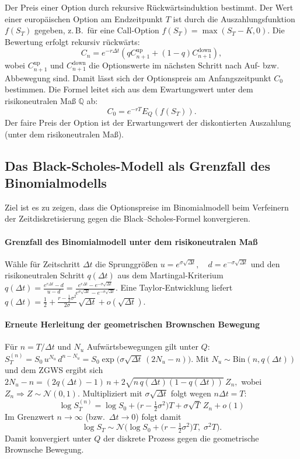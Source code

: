 \begin{satz}
Der Preis einer Option durch rekursive Rückwärtsinduktion bestimmt. 
Der Wert einer europäischen Option am Endzeitpunkt $T$ ist durch die Auszahlungsfunktion $f(S_T)$ gegeben, z.\,B.\ für eine Call-Option $f(S_T) = \max(S_T - K, 0)$.
Die Bewertung erfolgt rekursiv rückwärts:
$$
C_n = e^{-r \Delta t} \left( q C_{n+1}^\text{up} + (1-q) C_{n+1}^\text{down} \right),
$$
wobei $C_{n+1}^\text{up}$ und $C_{n+1}^\text{down}$ die Optionswerte im nächsten Schritt nach Auf- bzw. Abbewegung sind.
Damit lässt sich der Optionspreis am Anfangszeitpunkt $C_0$ bestimmen. Die Formel leitet
sich aus dem Ewartungswert unter dem risikoneutralen Maß $\mathbb{Q}$ ab:
$$
C_0 = e^{-r T} E_Q(f(S_T)).
$$
Der faire Preis der Option ist der Erwartungswert der diskontierten Auszahlung (unter dem risikoneutralen Maß).
\end{satz}

\subsection{Das Black-Scholes-Modell als Grenzfall des Binomialmodells}
Ziel ist es zu zeigen, dass die Optionspreise im Binomialmodell
beim Verfeinern der Zeitdiskretisierung gegen die Black–Scholes-Formel konvergieren.

\paragraph{Grenzfall des Binomialmodell unter dem risikoneutralen Maß}
Wähle für Zeitschritt $\Delta t$ die Sprunggrößen
$
u = e^{\sigma \sqrt{\Delta t}},\quad d = e^{-\sigma \sqrt{\Delta t}}
$
und den risikoneutralen Schritt $q(\Delta t)$ aus dem Martingal-Kriterium
$
q(\Delta t) = \frac{e^{r \Delta t} - d}{u - d}
= \frac{e^{r \Delta t} - e^{-\sigma \sqrt{\Delta t}}}{e^{\sigma \sqrt{\Delta t}} - e^{-\sigma \sqrt{\Delta t}}}.
$
Eine Taylor-Entwicklung liefert
$
q(\Delta t) = \tfrac12 + \frac{r - \tfrac12 \sigma^2}{2\sigma}\,\sqrt{\Delta t} + o(\sqrt{\Delta t}).
$

\paragraph{Erneute Herleitung der geometrischen Brownschen Bewegung}
Für $n=T/\Delta t$ und $N_u$ Aufwärtsbewegungen gilt unter $Q$:
$
S_T^{(n)} = S_0\, u^{N_u}\, d^{n-N_u}
= S_0 \exp\!\big(\sigma \sqrt{\Delta t}\,(2N_u - n)\big).
$
Mit $N_u \sim \mathrm{Bin}(n, q(\Delta t))$ und dem ZGWS ergibt sich
$
2N_u - n
= (2q(\Delta t)-1)\,n + 2\sqrt{n\,q(\Delta t)(1-q(\Delta t))}\,Z_n,
$
wobei $Z_n \Rightarrow Z \sim \mathcal N(0,1)$. Multipliziert mit $\sigma \sqrt{\Delta t}$ folgt wegen $n\Delta t = T$:
$$
\log S_T^{(n)}
= \log S_0 + \big(r - \tfrac12 \sigma^2\big)T + \sigma \sqrt{T}\,Z_n + o(1)
$$
Im Grenzwert $n\to\infty$ (bzw.\ $\Delta t \to 0$) folgt damit
$$
\log S_T \sim \mathcal N\!\Big(\log S_0 + \big(r - \tfrac12 \sigma^2\big)T,\;\sigma^2 T\Big).
$$
Damit konvergiert unter $Q$ der diskrete Prozess gegen 
die geometrische Brownsche Bewegung.

